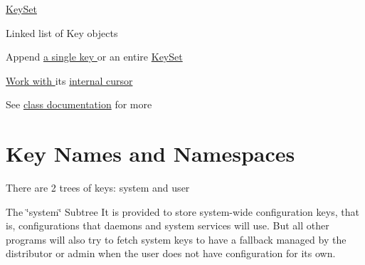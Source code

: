 \hyperlink{group__keyset}{Key\-Set }
\begin{DoxyItemize}
\item Linked list of Key objects
\item Append \hyperlink{group__keyset_gaa5a1d467a4d71041edce68ea7748ce45}{a single key } or an entire \hyperlink{group__keyset_ga21eb9c3a14a604ee3a8bdc779232e7b7}{Key\-Set }
\item \hyperlink{group__keyset_ga317321c9065b5a4b3e33fe1c399bcec9}{Work with } its \hyperlink{group__keyset_ga4287b9416912c5f2ab9c195cb74fb094}{internal cursor }
\item See \hyperlink{group__keyset}{class documentation} for more
\end{DoxyItemize}\hypertarget{index_keynames}{}\section{Key Names and Namespaces}\label{index_keynames}
There are 2 trees of keys\-: {\ttfamily system} and {\ttfamily user} 


\begin{DoxyItemize}
\item The \char`\"{}system\char`\"{} Subtree It is provided to store system-\/wide configuration keys, that is, configurations that daemons and system services will use. But all other programs will also try to fetch system keys to have a fallback managed by the distributor or admin when the user does not have configuration for its own.
\end{DoxyItemize}


